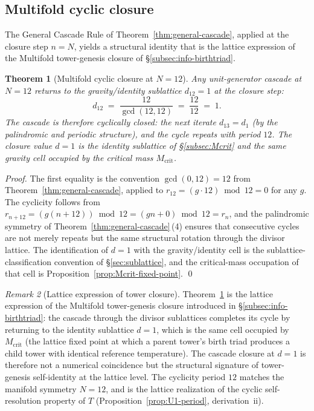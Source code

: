 \documentclass[11pt,a4paper]{article}
\newtheorem{theorem}{Theorem}[section]
\theoremstyle{definition}
\theoremstyle{remark}
\newtheorem{remark}[theorem]{Remark}
\begin{document}
\subsection{Multifold cyclic closure}\label{subsec:multifold-closure}

The General Cascade Rule of Theorem~\ref{thm:general-cascade}, applied at the closure step $n = N$, yields a structural identity that is the lattice expression of the Multifold tower-genesis closure of \S\ref{subsec:info-birthtriad}.

\begin{theorem}[Multifold cyclic closure at $N=12$]\label{thm:multifold-closure}
Any unit-generator cascade at $N=12$ returns to the gravity/identity sublattice $d_{12} = 1$ at the closure step:
\[
d_{12} \;=\; \frac{12}{\gcd(12,12)} \;=\; \frac{12}{12} \;=\; 1.
\]
The cascade is therefore cyclically closed: the next iterate $d_{13} = d_{1}$ (by the palindromic and periodic structure), and the cycle repeats with period $12$. The closure value $d=1$ is the identity sublattice of \S\ref{subsec:Mcrit} and the same gravity cell occupied by the critical mass $M_{\mathrm{crit}}$.
\end{theorem}

\begin{proof}
The first equality is the convention $\gcd(0,12) = 12$ from Theorem~\ref{thm:general-cascade}, applied to $r_{12} = (g\cdot 12) \bmod 12 = 0$ for any $g$. The cyclicity follows from $r_{n+12} = (g(n+12)) \bmod 12 = (gn + 0) \bmod 12 = r_{n}$, and the palindromic symmetry of Theorem~\ref{thm:general-cascade}\,(4) ensures that consecutive cycles are not merely repeats but the same structural rotation through the divisor lattice. The identification of $d=1$ with the gravity/identity cell is the sublattice-classification convention of \S\ref{sec:sublattice}, and the critical-mass occupation of that cell is Proposition~\ref{prop:Mcrit-fixed-point}. \qed
\end{proof}

\begin{remark}[Lattice expression of tower closure]\label{rem:multifold-closure}
Theorem~\ref{thm:multifold-closure} is the lattice expression of the Multifold tower-genesis closure introduced in \S\ref{subsec:info-birthtriad}: the cascade through the divisor sublattices completes its cycle by returning to the identity sublattice $d=1$, which is the same cell occupied by $M_{\mathrm{crit}}$ (the lattice fixed point at which a parent tower's birth triad produces a child tower with identical reference temperature). The cascade closure at $d=1$ is therefore not a numerical coincidence but the structural signature of tower-genesis self-identity at the lattice level. The cyclicity period $12$ matches the manifold symmetry $N=12$, and is the lattice realization of the cyclic self-resolution property of $T$ (Proposition~\ref{prop:U1-period}, derivation~ii).
\end{remark}
\end{document}

